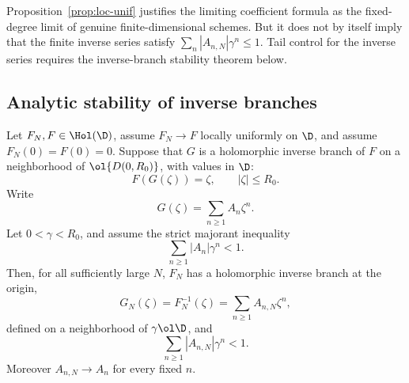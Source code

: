 \begin{remark}
Proposition~\ref{prop:loc-unif} justifies the limiting coefficient formula as the fixed-degree limit of genuine finite-dimensional schemes.  But it does not by itself imply that the finite inverse series satisfy $\sum_n|A_{n,N}|\gamma^n\le1$.  Tail control for the inverse series requires the inverse-branch stability theorem below.
\end{remark}

\subsection{Analytic stability of inverse branches}

\begin{theorem}\label{thm:finite-transfer}
Let $F_N,F\in\Hol(\D)$, assume $F_N\to F$ locally uniformly on $\D$, and assume $F_N(0)=F(0)=0$.  Suppose that $G$ is a holomorphic inverse branch of $F$ on a neighborhood of $\ol{D(0,R_0)}$, with values in $\D$:
\[
  F(G(\zeta))=\zeta,
  \qquad |\zeta|\le R_0.
\]
Write
\[
  G(\zeta)=\sum_{n\ge1}A_n\zeta^n.
\]
Let $0<\gamma<R_0$, and assume the strict majorant inequality
\[
  \sum_{n\ge1}|A_n|\gamma^n<1.
\]
Then, for all sufficiently large $N$, $F_N$ has a holomorphic inverse branch at the origin,
\[
  G_N(\zeta)=F_N^{-1}(\zeta)=\sum_{n\ge1}A_{n,N}\zeta^n,
\]
defined on a neighborhood of $\gamma\ol\D$, and
\[
  \sum_{n\ge1}|A_{n,N}|\gamma^n<1.
\]
Moreover $A_{n,N}\to A_n$ for every fixed $n$.
\end{theorem}

